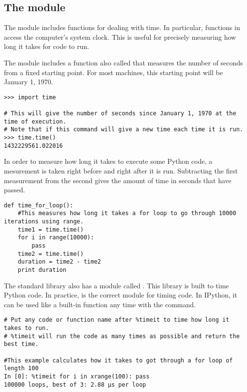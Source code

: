 \subsection*{The  module}

The  module includes functions for dealing with time.
In particular, functions in  access the computer's system clock.
This is useful for precisely measuring how long it takes for code to run.

The  module includes a function also called  that measures the number of seconds from a fixed starting point.
For most machines, this starting point will be January 1, 1970.

\begin{lstlisting}
>>> import time

# This will give the number of seconds since January 1, 1970 at the time of execution.
# Note that if this command will give a new time each time it is run.
>>> time.time()
1432229561.022016
\end{lstlisting}

In order to measure how long it takes to execute some Python code, a mesurement is taken right before and right after it is run.
Subtracting the first measurement from the second gives the amount of time in seconds that have passed.

\begin{lstlisting}
def time_for_loop():
	#This measures how long it takes a for loop to go through 10000 iterations using range.
	time1 = time.time()
	for i in range(10000):
		pass
	time2 = time.time()
	duration = time2 - time2
	print duration
\end{lstlisting}

The standard library also has a module called .
This library is built to time Python code.
In practice,  is the correct module for timing code.
In IPython, it can be used like a built-in function any time with the  command.

\begin{lstlisting}
# Put any code or function name after %timeit to time how long it takes to run.
# %timeit will run the code as many times as possible and return the best time.

#This example calculates how it takes to got through a for loop of length 100
In [0]: %timeit for i in xrange(100): pass 
100000 loops, best of 3: 2.88 µs per loop 
\end{lstlisting}

